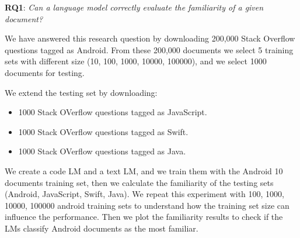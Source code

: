 \documentclass[12pt,mscthesis]{usiinfthesis}
\begin{document}
	 \textbf{RQ1}: \emph{Can a language model correctly evaluate the familiarity of a given document?}


		We have answered this research question by downloading 200,000 Stack Overflow questions tagged as Android. From these 200,000 documents we select 5 training sets with different size (10, 100, 1000, 10000, 100000), and we select 1000 documents for testing.


		We extend the testing set by downloading: 
		\begin{itemize}
			\item 1000 Stack OVerflow questions tagged as JavaScript.
			\item 1000 Stack OVerflow questions tagged as Swift.
			\item 1000 Stack OVerflow questions tagged as Java.
		\end{itemize}

		We create a code LM and a text LM, and we train them with the Android 10 documents training set, then we calculate the familiarity of the testing sets
		(Android, JavaScript, Swift, Java). We repeat this experiment with 100, 1000, 10000, 100000 android training sets to understand how the training set size can influence the performance. Then we plot the familiarity results to check if the LMs classify Android documents as the most familiar.\\
\end{document}
